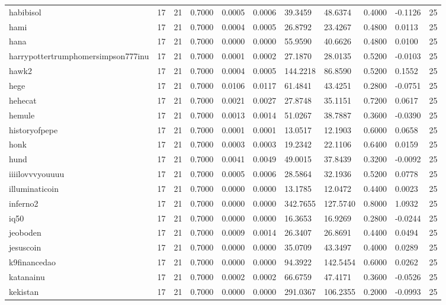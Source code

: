 \begin{table}[htbp]
\begin{tabular}{lllllllllll}
habibisol & 17 & 21 & 0.7000 & 0.0005 & 0.0006 & 39.3459 & 48.6374 & 0.4000 & -0.1126 & 25 \\
hami & 17 & 21 & 0.7000 & 0.0004 & 0.0005 & 26.8792 & 23.4267 & 0.4800 & 0.0113 & 25 \\
hana & 17 & 21 & 0.7000 & 0.0000 & 0.0000 & 55.9590 & 40.6626 & 0.4800 & 0.0100 & 25 \\
harrypottertrumphomersimpson777inu & 17 & 21 & 0.7000 & 0.0001 & 0.0002 & 27.1870 & 28.0135 & 0.5200 & -0.0103 & 25 \\
hawk2 & 17 & 21 & 0.7000 & 0.0004 & 0.0005 & 144.2218 & 86.8590 & 0.5200 & 0.1552 & 25 \\
hege & 17 & 21 & 0.7000 & 0.0106 & 0.0117 & 61.4841 & 43.4251 & 0.2800 & -0.0751 & 25 \\
hehecat & 17 & 21 & 0.7000 & 0.0021 & 0.0027 & 27.8748 & 35.1151 & 0.7200 & 0.0617 & 25 \\
hemule & 17 & 21 & 0.7000 & 0.0013 & 0.0014 & 51.0267 & 38.7887 & 0.3600 & -0.0390 & 25 \\
historyofpepe & 17 & 21 & 0.7000 & 0.0001 & 0.0001 & 13.0517 & 12.1903 & 0.6000 & 0.0658 & 25 \\
honk & 17 & 21 & 0.7000 & 0.0003 & 0.0003 & 19.2342 & 22.1106 & 0.6400 & 0.0159 & 25 \\
hund & 17 & 21 & 0.7000 & 0.0041 & 0.0049 & 49.0015 & 37.8439 & 0.3200 & -0.0092 & 25 \\
iiiilovvvyouuuu & 17 & 21 & 0.7000 & 0.0005 & 0.0006 & 28.5864 & 32.1936 & 0.5200 & 0.0778 & 25 \\
illuminaticoin & 17 & 21 & 0.7000 & 0.0000 & 0.0000 & 13.1785 & 12.0472 & 0.4400 & 0.0023 & 25 \\
inferno2 & 17 & 21 & 0.7000 & 0.0000 & 0.0000 & 342.7655 & 127.5740 & 0.8000 & 1.0932 & 25 \\
iq50 & 17 & 21 & 0.7000 & 0.0000 & 0.0000 & 16.3653 & 16.9269 & 0.2800 & -0.0244 & 25 \\
jeoboden & 17 & 21 & 0.7000 & 0.0009 & 0.0014 & 26.3407 & 26.8691 & 0.4400 & 0.0494 & 25 \\
jesuscoin & 17 & 21 & 0.7000 & 0.0000 & 0.0000 & 35.0709 & 43.3497 & 0.4000 & 0.0289 & 25 \\
k9financedao & 17 & 21 & 0.7000 & 0.0000 & 0.0000 & 94.3922 & 142.5454 & 0.6000 & 0.0262 & 25 \\
katanainu & 17 & 21 & 0.7000 & 0.0002 & 0.0002 & 66.6759 & 47.4171 & 0.3600 & -0.0526 & 25 \\
kekistan & 17 & 21 & 0.7000 & 0.0000 & 0.0000 & 291.0367 & 106.2355 & 0.2000 & -0.0993 & 25 \\

\end{tabular}
\end{table}
